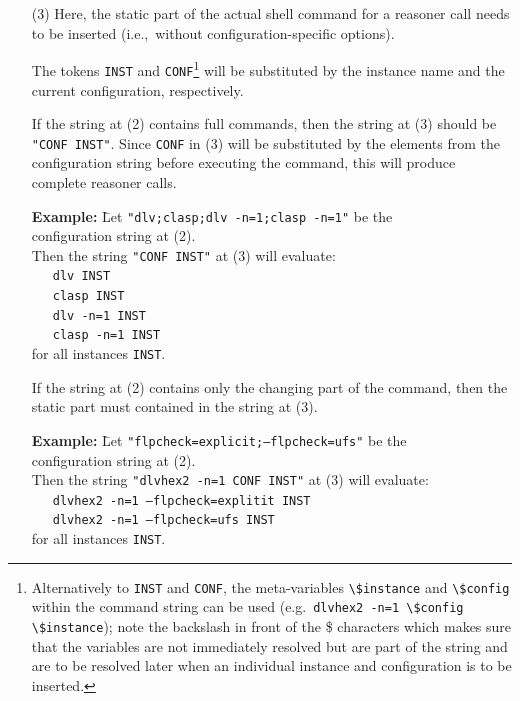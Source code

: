 \documentclass[a4paper]{article}
\begin{document}
\begin{enumerate}
			\item[(3)] Here, the static part of the actual shell command for a reasoner call needs to be inserted (i.e.,~without configuration-specific options).

				The tokens {\tt INST} and {\tt CONF}\footnote{
				Alternatively to {\tt INST} and {\tt CONF}, the meta-variables {\tt \textbackslash\$instance} and {\tt \textbackslash\$config}
				within the command string can be used (e.g.~{\tt dlvhex2 -n=1 \textbackslash\$config \textbackslash\$instance});
				note the backslash in front of the {\$} characters which makes sure that the variables are not immediately resolved but
				are part of the string and are to be resolved later when an individual instance and configuration is to be inserted.}
				will be substituted by the instance name and the current configuration, respectively.

				If the string at (2) contains full commands, then
				the string at (3) should be {\tt "CONF INST"}. Since {\tt CONF} in (3)
				will be substituted by the elements from the configuration string before executing the command, this will
				produce complete reasoner calls.

				\begin{tabbing}
					\textbf{Example: } \= Let {\tt "dlv;clasp;dlv -n=1;clasp -n=1"} be the \\
					\> configuration string at (2). \\
					\> Then the string {\tt "CONF INST"} at (3) will evaluate: \\
					\> \ \ \ {\tt dlv INST} \\
					\> \ \ \ {\tt clasp INST} \\
					\> \ \ \ {\tt dlv -n=1 INST} \\
					\> \ \ \ {\tt clasp -n=1 INST} \\
					\> for all instances {\tt INST}.
				\end{tabbing}

				If the string at (2) contains only the changing part of the command,
				then the static part must contained in the string at (3).

				\begin{tabbing}
					\textbf{Example: } \= Let {\tt "flpcheck=explicit;--flpcheck=ufs"} be the \\
					\> configuration string at (2). \\
					\> Then the string {\tt "dlvhex2 -n=1 CONF INST"} at (3) will evaluate: \\
					\> \ \ \ {\tt dlvhex2 -n=1 --flpcheck=explitit INST} \\
					\> \ \ \ {\tt dlvhex2 -n=1 --flpcheck=ufs INST} \\
					\> for all instances {\tt INST}.
				\end{tabbing}
			\end{enumerate}
\end{document}
